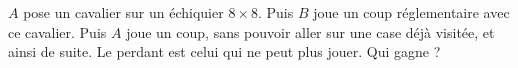 $A$ pose un cavalier sur un échiquier $8 \times 8$. Puis $B$ joue un coup réglementaire avec ce cavalier. Puis $A$ joue un coup, sans pouvoir aller sur une case déjà visitée, et ainsi de suite. Le perdant est celui qui ne peut plus jouer. Qui gagne ?
